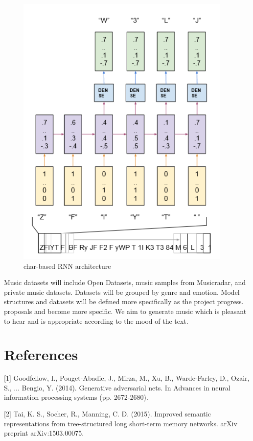 \documentclass{article}
\begin{document}
\begin{figure}[hbt!]
  \centering
  \includegraphics[scale=0.5]{./image/char-based_RNN_arch.png}
  \caption{char-based RNN architecture}
\end{figure}

Music datasets will include Open Datasets, music samples from Musicradar, and private music datasets. Datasets will be grouped by genre and emotion. Model structures and datasets will be defined more specifically as the project progress. proposals and become more specific. We aim to generate music which is pleasant to hear and is appropriate according to the mood of the text.

\section*{References}

\small
[1] Goodfellow, I., Pouget-Abadie, J., Mirza, M., Xu, B., Warde-Farley, D., Ozair, S., ... Bengio, Y. (2014). Generative adversarial nets. In Advances in neural information processing systems (pp. 2672-2680).

[2] Tai, K. S., Socher, R., Manning, C. D. (2015). Improved semantic representations from tree-structured long short-term memory networks. arXiv preprint arXiv:1503.00075.
\end{document}
